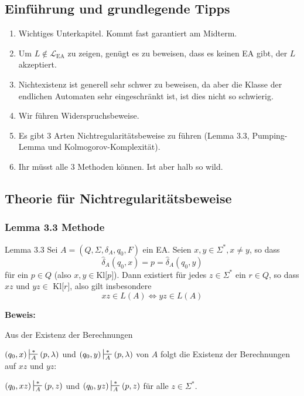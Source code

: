 \documentclass[a4paper, 11pt]{article}
\begin{document}
    \subsection{Einführung und grundlegende Tipps}
    \begin{enumerate}[label= \roman*.]
        \item Wichtiges Unterkapitel. Kommt fast garantiert am Midterm.
        \item Um $L \notin \mathcal{L}_{\text{EA}}$ zu zeigen, genügt es zu beweisen, dass es keinen EA gibt, der $L$ akzeptiert.
        \item Nichtexistenz ist generell sehr schwer zu beweisen, da aber die Klasse der endlichen Automaten sehr eingeschränkt ist, ist dies nicht so schwierig.
        \item Wir führen Widerspruchsbeweise.
        \item Es gibt 3 Arten Nichtregularitätsbeweise zu führen (Lemma 3.3, Pumping-Lemma und Kolmogorov-Komplexität).
        \item Ihr müsst alle 3 Methoden können. Ist aber halb so wild.
     \end{enumerate}

\subsection{Theorie für Nichtregularitätsbeweise}

\subsubsection{Lemma 3.3 Methode}
    \begin{mainbox}{Lemma 3.3}
        Sei $A = (Q, \Sigma, \delta_A, q_0, F)$ ein EA. Seien $x, y \in \Sigma^*, x \neq y$, so dass 
    $$\hat{\delta}_A(q_0, x) = p = \hat{\delta}_A(q_0, y)$$
    für ein $p \in Q$ (also $x,y \in \text{Kl[$p$]}$). Dann existiert für jedes $z \in \Sigma^*$ ein $r \in Q$, so dass $xz$ und $yz \in$ Kl[$r$], also gilt insbesondere 
    $$xz \in L(A) \iff yz \in L(A)$$
    \end{mainbox}

    \textbf{Beweis: }
    
    Aus der Existenz der Berechnungen 

    $(q_0, x) \sststile{A}{*} (p, \lambda)$ und $(q_0, y) \sststile{A}{*} (p, \lambda)$
    von $A$ folgt die Existenz der Berechnungen auf $xz$ und $yz$:

    $(q_0, xz) \sststile{A}{*} (p, z)$ und $(q_0, yz) \sststile{A}{*} (p, z)$ für alle $z \in \Sigma^*$.
\end{document}
